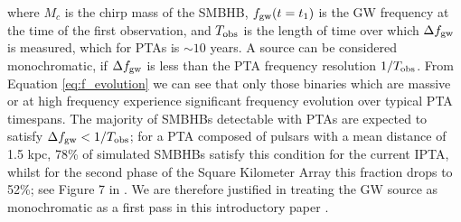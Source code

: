 \documentclass[fleqn,usenatbib,useAMS]{mnras}
\begin{document}
where $M_c$ is the chirp mass of the SMBHB, $f_{\rm gw}(t=t_1)$ is the GW frequency at the time of the first observation, and $T_{\rm obs}$ is the length of time over which $\Delta f_{\rm gw}$ is measured, which for PTAs is $\sim 10$ years. A source can be considered monochromatic, if $\Delta f_{\rm gw}$ is less than the PTA frequency resolution $1/T_{\rm obs}$. From Equation \eqref{eq:f_evolution} we can see that only those binaries which are massive or at high frequency experience significant frequency evolution over typical PTA timespans. The majority of SMBHBs detectable with PTAs are expected to satisfy $\Delta f_{\rm gw} < 1/T_{\rm obs}$; for a PTA composed of pulsars with a mean distance of 1.5 kpc, 78\% of simulated SMBHBs satisfy this condition for the current IPTA, whilst for the second phase of the Square Kilometer Array this fraction drops to 52\%; see Figure 7 in  \cite{Rosado10.1093/mnras/stv1098}. We are therefore justified in treating the GW source as monochromatic as a first pass in this introductory paper \citep{Sesana10,Sesana2010,Ellis2012ApJ}. \newline 
\end{document}
